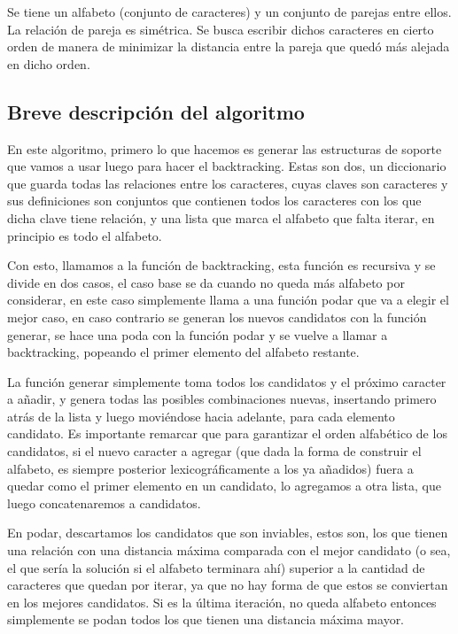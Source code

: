 \documentclass[a4paper, 10pt]{article}
\begin{document}
Se tiene un alfabeto (conjunto de caracteres) y un conjunto de parejas entre ellos. La relación de pareja es simétrica.
Se busca escribir dichos caracteres en cierto orden de manera de minimizar la distancia entre la pareja que quedó más
alejada en dicho orden.

\subsection{Breve descripción del algoritmo}

En este algoritmo, primero lo que hacemos es generar las estructuras de soporte que vamos a usar luego para hacer el backtracking. Estas son dos, un diccionario que guarda todas las relaciones entre los caracteres, cuyas claves son caracteres y sus definiciones son conjuntos que contienen todos los caracteres con los que dicha clave tiene relación, y una lista que marca el alfabeto que falta iterar, en principio es todo el alfabeto.

Con esto, llamamos a la función de backtracking, esta función es recursiva y se divide en dos casos, el caso base se da cuando no queda más alfabeto por considerar, en este caso simplemente llama a una función podar que va a elegir el mejor caso, en caso contrario se generan los nuevos candidatos con la función generar, se hace una poda con la función podar y se vuelve a llamar a backtracking, popeando el primer elemento del alfabeto restante.

La función generar simplemente toma todos los candidatos y el próximo caracter a añadir, y genera todas las posibles combinaciones nuevas, insertando primero atrás de la lista y luego moviéndose hacia adelante, para cada elemento candidato. Es importante remarcar que para garantizar el orden alfabético de los candidatos, si el nuevo caracter a agregar (que dada la forma de construir el alfabeto, es siempre posterior lexicográficamente a los ya añadidos) fuera a quedar como el primer elemento en un candidato, lo agregamos a otra lista, que luego concatenaremos a candidatos.

En podar, descartamos los candidatos que son inviables, estos son, los que tienen una relación con una distancia máxima comparada con el mejor candidato (o sea, el que sería la solución si el alfabeto terminara ahí) superior a la cantidad de caracteres que quedan por iterar, ya que no hay forma de que estos se conviertan en los mejores candidatos. Si es la última iteración, no queda alfabeto entonces simplemente se podan todos los que tienen una distancia máxima mayor.
\end{document}
